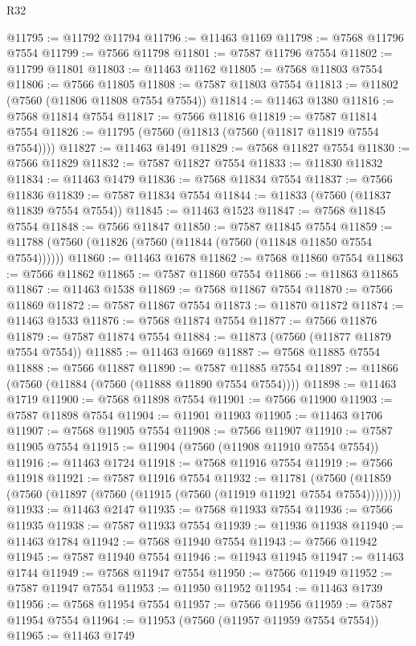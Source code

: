 \begin{lexlean}{R32}
\begin{coremodule}
@11795 := @11792 @11794
@11796 := @11463 @1169
@11798 := @7568 @11796 @7554
@11799 := @7566 @11798
@11801 := @7587 @11796 @7554
@11802 := @11799 @11801
@11803 := @11463 @1162
@11805 := @7568 @11803 @7554
@11806 := @7566 @11805
@11808 := @7587 @11803 @7554
@11813 := @11802 (@7560 (@11806 @11808 @7554 @7554))
@11814 := @11463 @1380
@11816 := @7568 @11814 @7554
@11817 := @7566 @11816
@11819 := @7587 @11814 @7554
@11826 := @11795 (@7560 (@11813 (@7560 (@11817 @11819 @7554 @7554))))
@11827 := @11463 @1491
@11829 := @7568 @11827 @7554
@11830 := @7566 @11829
@11832 := @7587 @11827 @7554
@11833 := @11830 @11832
@11834 := @11463 @1479
@11836 := @7568 @11834 @7554
@11837 := @7566 @11836
@11839 := @7587 @11834 @7554
@11844 := @11833 (@7560 (@11837 @11839 @7554 @7554))
@11845 := @11463 @1523
@11847 := @7568 @11845 @7554
@11848 := @7566 @11847
@11850 := @7587 @11845 @7554
@11859 := @11788 (@7560 (@11826 (@7560 (@11844 (@7560 (@11848 @11850 @7554 @7554))))))
@11860 := @11463 @1678
@11862 := @7568 @11860 @7554
@11863 := @7566 @11862
@11865 := @7587 @11860 @7554
@11866 := @11863 @11865
@11867 := @11463 @1538
@11869 := @7568 @11867 @7554
@11870 := @7566 @11869
@11872 := @7587 @11867 @7554
@11873 := @11870 @11872
@11874 := @11463 @1533
@11876 := @7568 @11874 @7554
@11877 := @7566 @11876
@11879 := @7587 @11874 @7554
@11884 := @11873 (@7560 (@11877 @11879 @7554 @7554))
@11885 := @11463 @1669
@11887 := @7568 @11885 @7554
@11888 := @7566 @11887
@11890 := @7587 @11885 @7554
@11897 := @11866 (@7560 (@11884 (@7560 (@11888 @11890 @7554 @7554))))
@11898 := @11463 @1719
@11900 := @7568 @11898 @7554
@11901 := @7566 @11900
@11903 := @7587 @11898 @7554
@11904 := @11901 @11903
@11905 := @11463 @1706
@11907 := @7568 @11905 @7554
@11908 := @7566 @11907
@11910 := @7587 @11905 @7554
@11915 := @11904 (@7560 (@11908 @11910 @7554 @7554))
@11916 := @11463 @1724
@11918 := @7568 @11916 @7554
@11919 := @7566 @11918
@11921 := @7587 @11916 @7554
@11932 := @11781
    (@7560 (@11859 (@7560 (@11897 (@7560 (@11915 (@7560 (@11919 @11921 @7554 @7554))))))))
@11933 := @11463 @2147
@11935 := @7568 @11933 @7554
@11936 := @7566 @11935
@11938 := @7587 @11933 @7554
@11939 := @11936 @11938
@11940 := @11463 @1784
@11942 := @7568 @11940 @7554
@11943 := @7566 @11942
@11945 := @7587 @11940 @7554
@11946 := @11943 @11945
@11947 := @11463 @1744
@11949 := @7568 @11947 @7554
@11950 := @7566 @11949
@11952 := @7587 @11947 @7554
@11953 := @11950 @11952
@11954 := @11463 @1739
@11956 := @7568 @11954 @7554
@11957 := @7566 @11956
@11959 := @7587 @11954 @7554
@11964 := @11953 (@7560 (@11957 @11959 @7554 @7554))
@11965 := @11463 @1749

\end{coremodule}
\end{lexlean}
